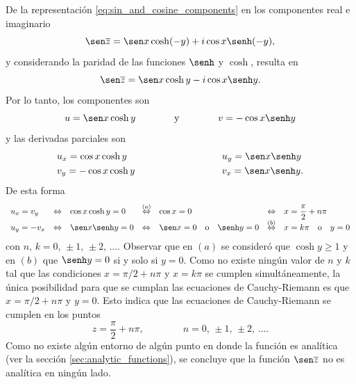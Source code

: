 \documentclass[a4paper]{report}
\begin{document}
De la representación \ref{eq:sin_and_cosine_components} en los componentes real e imaginario
\[
 \sen\overline{z}=\sen x\cosh(-y)+i\cos x\senh(-y),
\]
y considerando la paridad de las funciones \(\senh\) y \(\cosh\), resulta en
\[
 \sen\overline{z}=\sen x\cosh y-i\cos x\senh y.
\]
Por lo tanto, los componentes son 
 \[
  u=\sen x\cosh y
  \qquad\qquad\textrm{y}\qquad\qquad
  v=-\cos x\senh y
 \]
 y las derivadas parciales son
 \[
 \begin{array}{ll}
  u_x=\cos x\cosh y\qquad\qquad\qquad\qquad&u_y=\sen x\senh y\\[\smallskipamount]
  v_y=-\cos x\cosh y\qquad\qquad\qquad\qquad&v_x=\sen x\senh y.
 \end{array}
 \]
 De esta forma
 \[
 \begin{array}{lllllllll}
  u_x=v_y&\Leftrightarrow&\cos x\cosh y=0&\overset{(a)}{\Leftrightarrow}&\cos x=0&\Leftrightarrow&x=\dfrac{\pi}{2}+n\pi\\[\smallskipamount]
  u_y=-v_x&\Leftrightarrow&\sen x\senh y=0&\Leftrightarrow&\sen x=0\quad\textrm{o}\quad\senh y=0&\overset{(b)}{\Leftrightarrow}&x=k\pi\quad\textrm{o}\quad y=0
 \end{array}
 \] 
 con \(n,\,k=0,\,\pm1,\,\pm2,\,\dots\). Observar que en \((a)\) se consideró que \(\cosh y\geq1\) y en \((b)\) que \(\senh y=0\) si y solo si \(y=0\). Como no existe ningún valor de \(n\) y \(k\) tal que las condiciones \(x=\pi/2+n\pi\) y \(x=k\pi\) se cumplen simultáneamente, la única posibilidad para que se cumplan las ecuaciones de Cauchy-Riemann es que \(x=\pi/2+n\pi\) y \(y=0\). Esto indica que las ecuaciones de Cauchy-Riemann se cumplen en los puntos 
 \[
  z=\dfrac{\pi}{2}+n\pi,
  \qquad\qquad
  n=0,\,\pm1,\,\pm2,\,\dots.
 \]
Como no existe algún entorno de algún punto en donde la función es analítica (ver la sección \ref{sec:analytic_functions}), se concluye que la función \(\sen\overline{z}\) no es analítica en ningún lado. 
\end{document}

